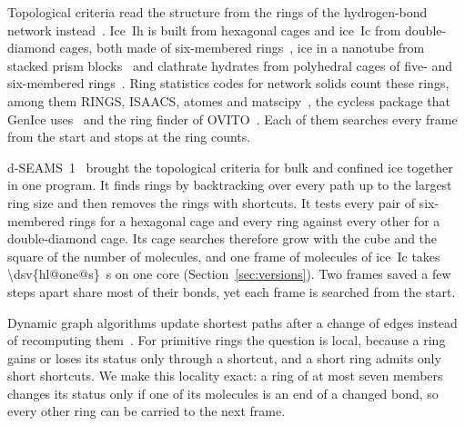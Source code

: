 \documentclass[preprint,12pt]{elsarticle}
\newcounter{bla}
\begin{document}
Topological criteria read the structure from the rings of the hydrogen-bond network instead~\cite{king1967ring,guttman1990ring,franzblau1993computation}.
Ice~Ih is built from hexagonal cages and ice~Ic from double-diamond cages, both made of six-membered rings~\cite{haji2015nucleation}, ice in a nanotube from stacked prism blocks~\cite{koga2001nanotube,goswami2020dseams} and clathrate hydrates from polyhedral cages of five- and six-membered rings~\cite{jacobson2010amorphous,matsumoto2007topological}.
Ring statistics codes for network solids count these rings, among them RINGS, ISAACS, atomes and matscipy~\cite{leroux2010rings,leroux2010isaacs,leroux2025atomes,grigorev2024matscipy}, the cycless package that GenIce uses~\cite{matsumoto2026cycless,matsumoto2018genice} and the ring finder of OVITO~\cite{ovitofindrings}.
Each of them searches every frame from the start and stops at the ring counts.

d-SEAMS~1~\cite{goswami2020dseams} brought the topological criteria for bulk and confined ice together in one program.
It finds rings by backtracking over every path up to the largest ring size and then removes the rings with shortcuts.
It tests every pair of six-membered rings for a hexagonal cage and every ring against every other for a double-diamond cage.
Its cage searches therefore grow with the cube and the square of the number of molecules, and one frame of  molecules of ice~Ic takes \qty{\dsv{hl@one@s}}{\second} on one core (Section~\ref{sec:versions}).
Two frames saved a few steps apart share most of their bonds, yet each frame is searched from the start.

Dynamic graph algorithms update shortest paths after a change of edges instead of recomputing them~\cite{demetrescu2004new}.
For primitive rings the question is local, because a ring gains or loses its status only through a shortcut, and a short ring admits only short shortcuts.
We make this locality exact: a ring of at most seven members changes its status only if one of its molecules is an end of a changed bond, so every other ring can be carried to the next frame.
\end{document}
